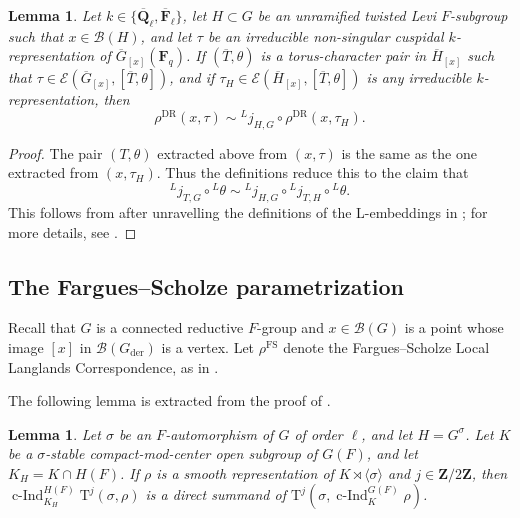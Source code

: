 \documentclass[reqno]{amsart}
\numberwithin{equation}{subsection}
\newcommand{\F}{\mathbf{F}}
\newcommand{\Q}{\mathbf{Q}}
\newcommand{\Z}{\mathbf{Z}}
\newcommand{\ol}[1]{\overline{#1}}
\newcommand{\ld}{{}^L}
\newcommand\cB{\mathcal{B}}
\newcommand\cE{\mathcal{E}}
\DeclareMathOperator{\FS}{FS}
\DeclareMathOperator{\cInd}{c-Ind}
\DeclareMathOperator{\der}{der}
\DeclareMathOperator{\DR}{DR}
\newcommand{\rT}{\ensuremath{\mathrm{T}}\xspace}
\newtheorem{lemma}[thm]{Lemma}
\theoremstyle{remark}
\numberwithin{equation}{subsection}
\numberwithin{figure}{subsection}
\begin{document}
\begin{lemma}\label{lemma:depth-0-unram-twisted-levi}
    Let $k \in \{\ol\Q_\ell, \ol\F_\ell\}$, let $H \subset G$ be an unramified twisted Levi $F$-subgroup such that $x \in \cB(H)$, and let $\tau$ be an irreducible non-singular cuspidal $k$-representation of $\ol G_{[x]}(\F_q)$. If $(\ol T, \theta)$ is a torus-character pair in $\ol H_{[x]}$ such that $\tau \in \cE(\ol G_{[x]}, [\ol T, \theta])$, and if $\tau_H \in \cE(\ol H_{[x]}, [\ol T, \theta])$ is any irreducible $k$-representation, then
    \[
    \rho^{\DR}(x, \tau) \sim \ld j_{H,G} \circ \rho^{\DR}(x, \tau_H).
    \]
\end{lemma}

\begin{proof}
    The pair $(T, \theta)$ extracted above from $(x, \tau)$ is the same as the one extracted from $(x, \tau_H)$. Thus the definitions reduce this to the claim that
    \[
    \ld j_{T, G} \circ \ld\theta \sim \ld j_{H,G} \circ \ld j_{T, H} \circ \ld\theta.
    \]
   This follows from \cite[Proposition~5.27, Proposition~6.9]{Kal21a} after unravelling the definitions of the L-embeddings in \cite[\S 6.1]{Kal21a}; for more details, see \cite[Proposition~5.3.2]{CF26a}.
\end{proof}



\subsection{The Fargues--Scholze parametrization}

Recall that $G$ is a connected reductive $F$-group and $x \in \cB(G)$ is a point whose image $[x]$ in $\cB(G_{\der})$ is a vertex. Let $\rho^{\FS}$ denote the Fargues--Scholze Local Langlands Correspondence, as in \cite{FS}.

The following lemma is extracted from the proof of \cite[Theorem~8.4.1]{F24}.

\begin{lemma}\label{lemma:tate-cohom-compact-induction}
    Let $\sigma$ be an $F$-automorphism of $G$ of order $\ell$, and let $H = G^\sigma$. Let $K$ be a $\sigma$-stable compact-mod-center open subgroup of $G(F)$, and let $K_H = K \cap H(F)$. If $\rho$ is a smooth representation of $K \rtimes \langle\sigma\rangle$ and $j \in \Z/2\Z$, then $\cInd_{K_H}^{H(F)} \rT^j(\sigma,\rho)$ is a direct summand of $\rT^j(\sigma,\cInd_K^{G(F)} \rho)$.
\end{lemma}
\end{document}

